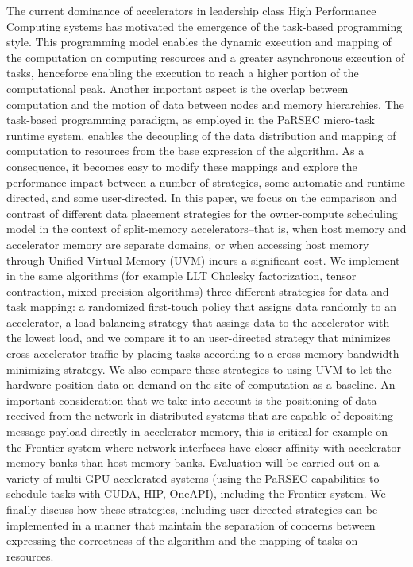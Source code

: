 The current dominance of accelerators in leadership class High Performance Computing systems has motivated the emergence of the task-based programming style. This programming model enables the dynamic execution and mapping of the computation on computing resources and a greater asynchronous execution of tasks, henceforce enabling the execution to reach a higher portion of the computational peak. Another important aspect is the overlap between computation and the motion of data between nodes and memory hierarchies. The task-based programming paradigm, as employed in the PaRSEC micro-task runtime system, enables the decoupling of the data distribution and mapping of computation to resources from the base expression of the algorithm. As a consequence, it becomes easy to modify these mappings and explore the performance impact between a number of strategies, some automatic and runtime directed, and some user-directed. In this paper, we focus on the comparison and contrast of different data placement strategies for the owner-compute scheduling model in the context of split-memory accelerators--that is, when host memory and accelerator memory are separate domains, or when accessing host memory through Unified Virtual Memory (UVM) incurs a significant cost. We implement in the same algorithms (for example LLT Cholesky factorization, tensor contraction, mixed-precision algorithms) three different strategies for data and task mapping: a randomized first-touch policy that assigns data randomly to an accelerator, a load-balancing strategy that assings data to the accelerator with the lowest load, and we compare it to an user-directed strategy that minimizes cross-accelerator traffic by placing tasks according to a cross-memory bandwidth minimizing strategy. We also compare these strategies to using UVM to let the hardware position data on-demand on the site of computation as a baseline. An important consideration that we take into account is the positioning of data received from the network in distributed systems that are capable of depositing message payload directly in accelerator memory, this is critical for example on the Frontier system where network interfaces have closer affinity with accelerator memory banks than host memory banks. Evaluation will be carried out on a variety of multi-GPU accelerated systems (using the PaRSEC capabilities to schedule tasks with CUDA, HIP, OneAPI), including the Frontier system. We finally discuss how these strategies, including user-directed strategies can be implemented in a manner that maintain the separation of concerns between expressing the correctness of the algorithm and the mapping of tasks on resources.
